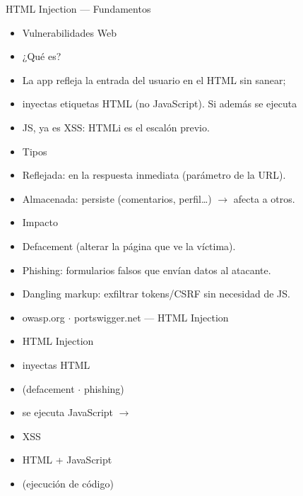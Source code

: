 \documentclass[aspectratio=169,10pt]{beamer}
\begin{document}
\begin{frame}[allowframebreaks]{HTML Injection --- Fundamentos}
\small
  \begin{itemize}
  \item Vulnerabilidades Web
  \item ¿Qué es?
  \item La app refleja la entrada del usuario en el HTML sin sanear;
  \item inyectas etiquetas HTML (no JavaScript). Si además se ejecuta
  \item JS, ya es XSS: HTMLi es el escalón previo.
  \item Tipos
  \item Reflejada: en la respuesta inmediata (parámetro de la URL).
  \item Almacenada: persiste (comentarios, perfil\dots{}) $\rightarrow$ afecta a otros.
  \item Impacto
  \item Defacement (alterar la página que ve la víctima).
  \item Phishing: formularios falsos que envían datos al atacante.
  \item Dangling markup: exfiltrar tokens/CSRF sin necesidad de JS.
  \item owasp.org $\cdot$ portswigger.net --- HTML Injection
  \item HTML Injection
  \item inyectas HTML
  \item (defacement $\cdot$ phishing)
  \item se ejecuta JavaScript $\rightarrow$
  \item XSS
  \item HTML + JavaScript
  \item (ejecución de código)
  \end{itemize}
\end{frame}
\end{document}
